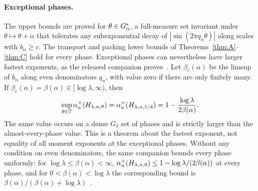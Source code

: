 \paragraph{Exceptional phases.} The upper bounds are proved for $\theta\in G_\alpha^*$, a full-measure set invariant under $\theta\mapsto\theta+\alpha$ that tolerates any subexponential decay of $|\sin(2\pi q_n\theta)|$ along scales with $b_n\ge c$. The transport and packing lower bounds of Theorems~\ref{thm:A}--\ref{thm:C} hold for every phase. Exceptional phases can nevertheless have larger fastest exponents, as the released companion proves~\cite[Theorems~B(1) and~C]{DMworstcase}. Let $\beta_e(\alpha)$ be the limsup of $b_n$ along even denominators $q_n$, with value zero if there are only finitely many. If $\beta_e(\alpha)=\beta(\alpha)\in[\log\lambda,\infty)$, then
\[
\sup_{\theta\in\mathbb T}\alpha_u^+(H_{\lambda,\alpha,\theta})
=\alpha_u^+(H_{\lambda,\alpha,1/4})
=1-\frac{\log\lambda}{2\beta(\alpha)}.
\]
The same value occurs on a dense $G_\delta$ set of phases and is strictly larger than the almost-every-phase value. This is a theorem about the fastest exponent, not equality of all moment exponents at the exceptional phases. Without any condition on even denominators, the same companion bounds every phase uniformly: for $\log\lambda\le\beta(\alpha)<\infty$, $\alpha_u^+(H_{\lambda,\alpha,\theta})\le1-\log\lambda/(2\beta(\alpha))$ at every phase, and for $0<\beta(\alpha)<\log\lambda$ the corresponding bound is $\beta(\alpha)/(\beta(\alpha)+\log\lambda)$~\cite[Theorem~A and Corollary~5.6]{DMworstcase}.

